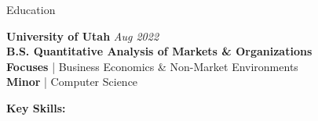 \documentclass{content/resume/resume}
\begin{document}
\begin{rSection}{Education}

{\bf University of Utah} \hfill {\em Aug 2022}
\vspace{2pt}
  \\ \textbf{B.S. Quantitative Analysis of Markets \& Organizations}
  \\ \textbf{Focuses} | Business Economics \& Non-Market Environments
  \\ \textbf{Minor} | Computer Science

%
%
%
%
%
%
%   
%
%
%
%

%
%
{\bf Key Skills:}
\vspace{-1.83em}


\end{rSection}
\end{document}
